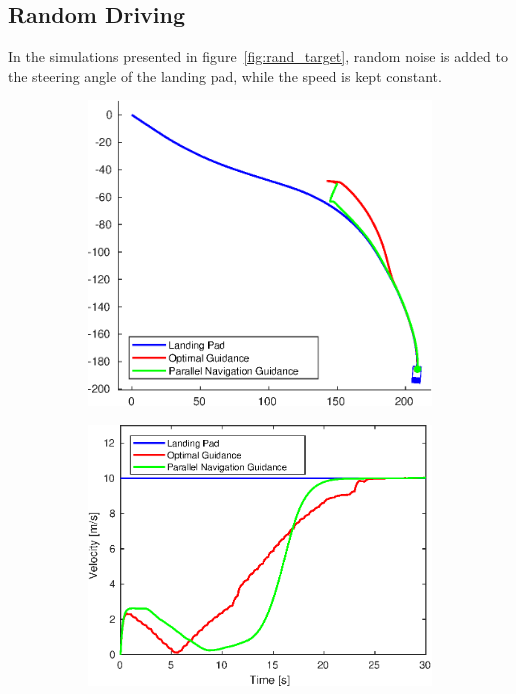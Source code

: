 \subsection{Random Driving} %
\label{sub:random_driving}
In the simulations presented in figure~\ref{fig:rand_target}, random noise is added to the steering angle of the landing pad, while the speed is kept constant.
\begin{figure}[ht!]
\centering
	\begin{subfigure}[b]{.5\textwidth}
		\centering
		\includegraphics[width=\linewidth]{img/plot/simulation/random_1.eps}
		\label{fig:random_1}
	\end{subfigure}%
	\begin{subfigure}[b]{.5\textwidth}
		\centering
		\includegraphics[width=\linewidth]{img/plot/simulation/random_1_vel.eps}

\end{subfigure}
\end{figure}
